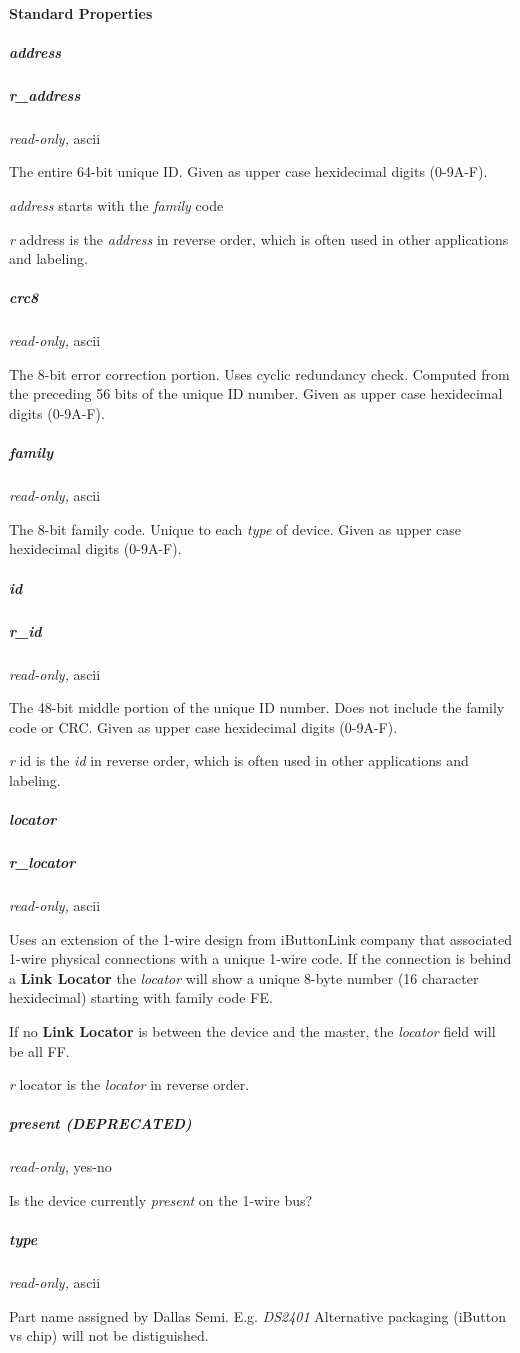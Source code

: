 \paragraph*{Standard Properties}
          
\subparagraph*{address}
\subparagraph*{r\_address}\textit{read-only,} ascii


The entire 64-bit unique ID. Given as upper case hexidecimal digits (0-9A-F).


\textit{address} starts with the \textit{family} code 

\textit{r} address is the \textit{address} in reverse order, which is often used in other
applications and labeling. 
\subparagraph*{crc8}\textit{read-only,} ascii 

The 8-bit error correction portion. Uses cyclic redundancy check. Computed
from the preceding 56 bits of the unique ID number. Given as upper case
hexidecimal digits (0-9A-F). 
\subparagraph*{family}\textit{read-only,} ascii 

The 8-bit family code. Unique to each \textit{type} of device. Given as upper case
hexidecimal digits (0-9A-F). 
\subparagraph*{id}
\subparagraph*{r\_id}\textit{read-only,} ascii 

The 48-bit middle portion of the unique ID number. Does not include the family
code or CRC. Given as upper case hexidecimal digits (0-9A-F). 

\textit{r} id is the \textit{id} in reverse order, which is often used in other applications
and labeling. 
\subparagraph*{locator}
\subparagraph*{r\_locator}\textit{read-only,} ascii 

Uses an extension of the 1-wire design from iButtonLink company that associated
1-wire physical connections with a unique 1-wire code. If the connection is
behind a \textbf{Link Locator} the \textit{locator} will show a unique 8-byte number (16 character
hexidecimal) starting with family code FE. 

If no \textbf{Link Locator} is between the device and the master, the \textit{locator} field
will be all FF. 

\textit{r} locator is the \textit{locator} in reverse order. 
\subparagraph*{present (DEPRECATED)}\textit{read-only,}
yes-no 

Is the device currently \textit{present} on the 1-wire bus? 
\subparagraph*{type}\textit{read-only,} ascii 

Part name assigned by Dallas Semi. E.g. \textit{DS2401} Alternative packaging (iButton
vs chip) will not be distiguished.  
